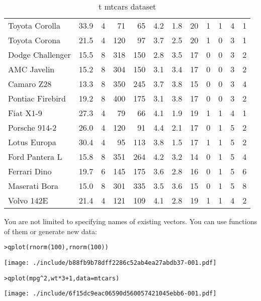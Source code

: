 \begin{table}[ht]
\begin{center}
\begin{tabular}{l|rrrrrrrrrrr}
Toyota Corolla & 33.9 & 4 & 71 & 65 & 4.2 & 1.8 & 20 & 1 & 1 & 4 & 1 \\
Toyota Corona & 21.5 & 4 & 120 & 97 & 3.7 & 2.5 & 20 & 1 & 0 & 3 & 1 \\
Dodge Challenger & 15.5 & 8 & 318 & 150 & 2.8 & 3.5 & 17 & 0 & 0 & 3 & 2 \\
AMC Javelin & 15.2 & 8 & 304 & 150 & 3.1 & 3.4 & 17 & 0 & 0 & 3 & 2 \\
Camaro Z28 & 13.3 & 8 & 350 & 245 & 3.7 & 3.8 & 15 & 0 & 0 & 3 & 4 \\
Pontiac Firebird & 19.2 & 8 & 400 & 175 & 3.1 & 3.8 & 17 & 0 & 0 & 3 & 2 \\
Fiat X1-9 & 27.3 & 4 & 79 & 66 & 4.1 & 1.9 & 19 & 1 & 1 & 4 & 1 \\
Porsche 914-2 & 26.0 & 4 & 120 & 91 & 4.4 & 2.1 & 17 & 0 & 1 & 5 & 2 \\
Lotus Europa & 30.4 & 4 & 95 & 113 & 3.8 & 1.5 & 17 & 1 & 1 & 5 & 2 \\
Ford Pantera L & 15.8 & 8 & 351 & 264 & 4.2 & 3.2 & 14 & 0 & 1 & 5 & 4 \\
Ferrari Dino & 19.7 & 6 & 145 & 175 & 3.6 & 2.8 & 16 & 0 & 1 & 5 & 6 \\
Maserati Bora & 15.0 & 8 & 301 & 335 & 3.5 & 3.6 & 15 & 0 & 1 & 5 & 8 \\
Volvo 142E & 21.4 & 4 & 121 & 109 & 4.1 & 2.8 & 19 & 1 & 1 & 4 & 2 \\
\hline
\end{tabular}
\caption{{	t mtcars} dataset}
\label{tab:mtcars}
\end{center}
\end{table}
\clearpage

You are not limited to specifying names of existing vectors.  You can use functions of them or generate new data:

\begin{alltt}
> qplot(rnorm(100), rnorm(100))
\end{alltt}
\texttt{[image: ./include/b88fb9b78dff2286c52ab4ea27abdb37-001.pdf]}
\begin{alltt}

> qplot(mpg^2, wt * 3 + 1, data = mtcars)
\end{alltt}
\texttt{[image: ./include/6f15dc9eac06590d560057421045ebb6-001.pdf]}
\begin{alltt}

\end{alltt}


